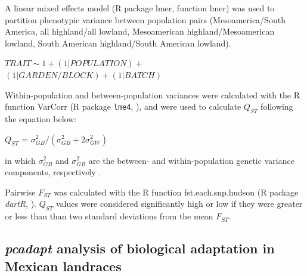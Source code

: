 \documentclass[9pt,twocolumn,twoside]{BioRxiv}
\begin{document}
A linear mixed effects model (R package lmer, function lmer) was used to partition phenotypic variance between population pairs (Mesoamerica/South America, all highland/all lowland, Mesoamerican highland/Mesoamerican lowland, South American highland/South American lowland).

\begin{center}

${ TRAIT \sim 1 + (1|POPULATION) + }$\\
${(1|GARDEN/BLOCK) + (1|BATCH)}$

\end{center}

Within-population and between-population variances were calculated with the R function VarCorr (R package \texttt{lme4}, \citealp{bates2014lme4}), and were used to calculate $Q_{ST}$ following the equation below:

\begin{center}
$Q_{ST}$ = \(\sigma^{2}_{GB}/(\sigma^{2}_{GB}+2\sigma^{2}_{GW})\)
\end{center}

\noindent in which $\sigma^{2}_{GB}$ and $\sigma^{2}_{GB}$ are the between- and within-population genetic variance components, respectively \cite{Leinonen2013-ic}.

Pairwise $F_{ST}$ was calculated with the R function fst.each.snp.hudson (R package \textit{dartR}, \citealp{gruber2018dartr}).
$Q_{ST}$ values were considered significantly high or low if they were greater or less than than two standard deviations from the mean $F_{ST}$.
\subsection{\textit{pcadapt} analysis of biological adaptation in Mexican landraces}
\end{document}
